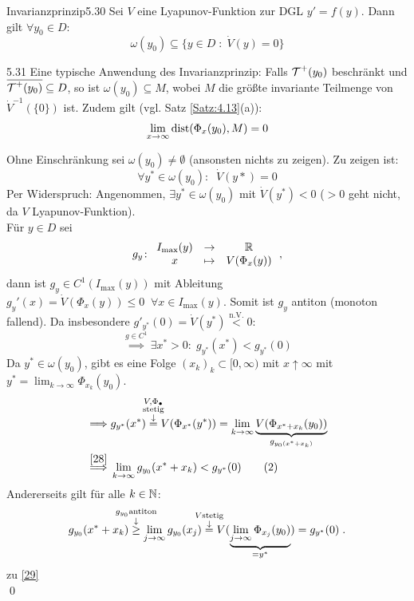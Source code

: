 \documentclass[a4paper]{article}
\begin{document}
\begin{Satz}{Invarianzprinzip}{5.30}
Sei $V$ eine Lyapunov-Funktion zur DGL $y'=f(y)$. Dann gilt $\forall y_0\in D$:
\[\omega(y_0)\subseteq \{y\in D\;:\;\dot{V}(y)=0\}\]
\end{Satz}

\begin{Bemerkung}{}{5.31}
Eine typische Anwendung des Invarianzprinzip: Falls $\operatorname{\mathcal{T}}^+(y_0)$ beschränkt und $\overline{\operatorname{\mathcal{T}}^+(y_0)}\subseteq D$, so ist $\omega(y_0)\subseteq M$, wobei $M$ die größte invariante Teilmenge von $\dot{V}^{-1}(\{0\})$ ist. Zudem gilt (vgl. Satz \ref{Satz:4.13}(a)):
\[\lim_{x\to\infty}\operatorname{\mathrm{dist}}(\Phi_x(y_0),M)=0\]
\end{Bemerkung}

\begin{Beweis}
Ohne Einschränkung sei $\omega(y_0)\ne\emptyset$ (ansonsten nichts zu zeigen). Zu zeigen ist:
\[\forall y^*\in\omega(y_0):\;\;\dot{V}(y*)=0\]
Per Widerspruch: Angenommen, $\exists y^*\in\omega(y_0)$ mit $\dot{V}(y^*)<0$ ($>0$ geht nicht, da $V$ Lyapunov-Funktion).\\
 Für $y\in D$ sei 
 \[g_y\colon \begin{array}{clc}
 I_{\max}(y)&\to&\mathbb R\\
 x&\mapsto& V(\Phi_x(y))
 \end{array}\,,\]
  dann ist $g_y\in C^1(I_{\max}(y))$ mit Ableitung $g_y'(x)=\dot V(\Phi_x(y))\le 0\;\;\forall x\in I_{\max}(y)$. Somit ist $g_y$ antiton (monoton fallend). Da insbesondere $g'_{y^*}(0)=\dot{V}(y^*)\overset{\text{n.V.}}{<}0$:
\[\overset{g\in C^1}{\implies}\exists x^*>0:\;g_{y^*}(x^*)<g_{y^*}(0)\tag{$1$}\label{28}\]
Da $y^*\in\omega(y_0)$, gibt es eine Folge $(x_k)_k\subset [0,\infty)$ mit $x\uparrow\infty$ mit $y^*=\lim_{k\to\infty}\Phi_{x_k}(y_0)$. 
\begin{align*}
\implies & g_{y^*}(x^*)\overset{\ms{V,\Phi_{\bullet}\\\text{stetig}\\\downarrow}}{=} V(\Phi_{x^*}(y^*))=\lim_{k\to\infty}\underbrace{V(\Phi_{x^*+x_k}(y_0))}_{g_{y_0(x^*+x_k)}}\\
\overset{\eqref{28}}{\implies}& \lim_{k\to\infty} g_{y_0}(x^*+x_k)<g_{y^*}(0)\tag{$2$}\label{29}
\end{align*}
Andererseits gilt für alle $k\in\operatorname{\mathbb N}$:
\[g_{y_0}(x^*+x_k)\overset{\ms{g_{y_0}\text{antiton}\\\downarrow}}{\ge }\lim_{j\to\infty}g_{y_0}(x_j)
\overset{\ms{V\text{stetig}\\\downarrow}}{=}V(\underbrace{\lim_{j\to\infty}\Phi_{x_j}(y_0)}_{=y^*})=g_{y^*}(0)\;.\]
\lightning{} zu \eqref{29}\\\qed
\end{Beweis}
\end{document}
